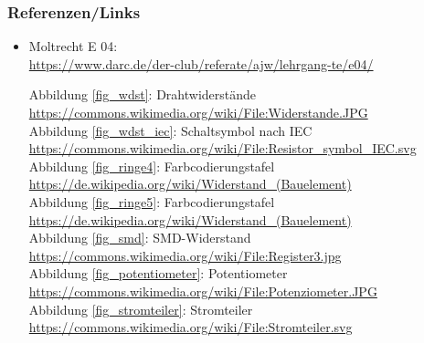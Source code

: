\begin{frame}
  \frametitle{Referenzen/Links}

  \footnotesize
  \begin{itemize}
    \item Moltrecht E 04: \\
      \url{https://www.darc.de/der-club/referate/ajw/lehrgang-te/e04/}
      
      Abbildung \ref{fig_wdst}: Drahtwiderstände\\
	    \url{https://commons.wikimedia.org/wiki/File:Widerstande.JPG}\\
	  Abbildung \ref{fig_wdst_iec}: Schaltsymbol nach IEC\\
		\url{https://commons.wikimedia.org/wiki/File:Resistor\_symbol\_IEC.svg}\\
      Abbildung \ref{fig_ringe4}: Farbcodierungstafel\\
		\url{https://de.wikipedia.org/wiki/Widerstand\_(Bauelement)}\\
	  Abbildung \ref{fig_ringe5}: Farbcodierungstafel\\
		\url{https://de.wikipedia.org/wiki/Widerstand\_(Bauelement)}\\
      Abbildung \ref{fig_smd}: SMD-Widerstand\\
		\url{https://commons.wikimedia.org/wiki/File:Register3.jpg}\\
	  Abbildung \ref{fig_potentiometer}: Potentiometer\\
		\url{https://commons.wikimedia.org/wiki/File:Potenziometer.JPG}\\
	  Abbildung \ref{fig_stromteiler}: Stromteiler\\
		\url{https://commons.wikimedia.org/wiki/File:Stromteiler.svg}\\

  \end{itemize}

\end{frame}


